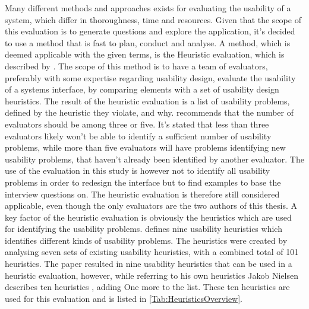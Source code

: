 Many different methods and approaches exists for evaluating the usability of a system, which differ in thoroughness, time and resources. Given that the scope of this evaluation is to generate questions and explore the application, it's decided to use a method that is fast to plan, conduct and analyse. A method, which is deemed applicable with the given terms, is the Heuristic evaluation, which is described by \parencite{WEB:Nielsen1994HowTo}. The scope of this method is to have a team of evaluators, preferably with some expertise regarding usability design, evaluate the usability of a systems interface, by comparing elements with a set of usability design heuristics. The result of the heuristic evaluation is a list of usability problems, defined by the heuristic they violate, and why. \textcite{WEB:Nielsen1994HowTo} recommends that the number of evaluators should be among three or five. It's stated that less than three evaluators likely won't be able to identify a sufficient number of usability problems, while more than five evaluators will have problems identifying new usability problems, that haven't already been identified by another evaluator. The use of the evaluation in this study is however not to identify all usability problems in order to redesign the interface but to find examples to base the interview questions on. The heuristic evaluation is therefore still considered applicable, even though the only evaluators are the two authors of this thesis.
\newpage
\noindent
A key factor of the heuristic evaluation is obviously the heuristics which are used for identifying the usability problems. \textcite{WEB:Nielsen1994} defines nine usability heuristics which identifies different kinds of usability problems. The heuristics were created by analysing seven sets of existing usability heuristics, with a combined total of 101 heuristics. The paper resulted in nine usability heuristics that can be used in a heuristic evaluation, however, while referring to his own heuristics \parencite{WEB:Nielsen1994} Jakob Nielsen describes ten heuristics \parencite{WEB:Nielsen1994Ten,WEB:Nielsen1994HowTo}, adding One more to the list. These ten heuristics are used for this evaluation and is listed in \autoref{Tab:HeuristicsOverview}.

